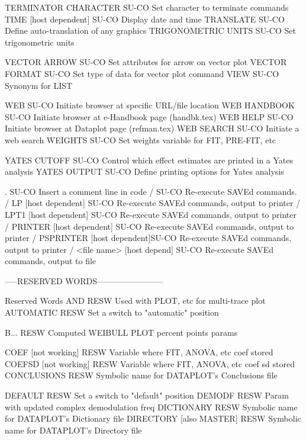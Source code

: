 TERMINATOR CHARACTER        SU-CO Set character to terminate commands
TIME   [host dependent]     SU-CO Display date and time
TRANSLATE                   SU-CO Define auto-translation of any graphics
TRIGONOMETRIC UNITS         SU-CO Set trigonometric units

VECTOR ARROW                SU-CO Set attributes for arrow on vector plot
VECTOR FORMAT               SU-CO Set type of data for vector plot command
VIEW                        SU-CO Synonym for LIST

WEB                         SU-CO Initiate browser at specific URL/file location
WEB HANDBOOK                SU-CO Initiate browser at e-Handbook page (handbk.tex)
WEB HELP                    SU-CO Initiate browser at Dataplot page (refman.tex)
WEB SEARCH                  SU-CO Initiate a web search
WEIGHTS                     SU-CO Set weights variable for FIT, PRE-FIT, etc

YATES CUTOFF                SU-CO Control which effect estimates are printed in a Yates analysis
YATES OUTPUT                SU-CO Define printing options for Yates analysis

.                           SU-CO Insert a comment line in code
/                           SU-CO Re-execute SAVEd commands.
/ LP [host dependent]       SU-CO Re-execute SAVEd commands, output to printer
/ LPT1 [host dependent]     SU-CO Re-execute SAVEd commands, output to printer
/ PRINTER [host dependent]  SU-CO Re-execute SAVEd commands, output to printer
/ PSPRINTER [host dependent]SU-CO Re-execute SAVEd commands, output to printer
/ <file name> [host depend] SU-CO Re-execute SAVEd commands, output to file

-----RESERVED WORDS------------------------

Reserved Words
AND                         RESW  Used with PLOT, etc for multi-trace plot
AUTOMATIC                   RESW  Set a switch to "automatic" position

B...                        RESW  Computed WEIBULL PLOT percent points params

COEF      [not working]     RESW  Variable where FIT, ANOVA, etc coef stored
COEFSD    [not working]     RESW  Variable where FIT, ANOVA, etc coef sd stored
CONCLUSIONS                 RESW  Symbolic name for DATAPLOT's Conclusions file

DEFAULT                     RESW  Set a switch to "default" position
DEMODF                      RESW  Param with updated complex demodulation freq
DICTIONARY                  RESW  Symbolic name for DATAPLOT's Dictionary file
DIRECTORY [also MASTER]     RESW  Symbolic name for DATAPLOT's Directory file

